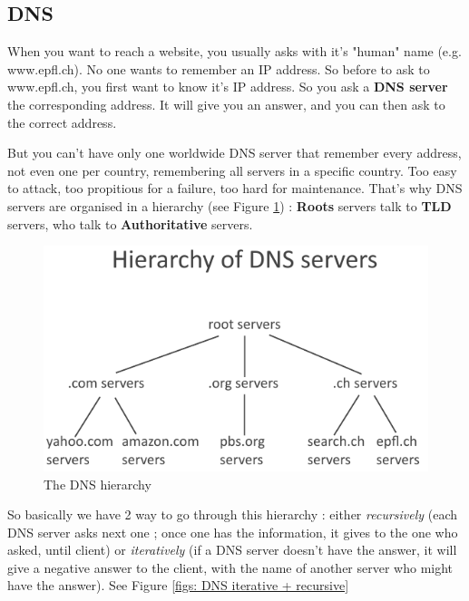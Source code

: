 \documentclass[12pt,a4paper]{article}
\begin{document}
\subsection{DNS}
When you want to reach a website, you usually asks with it's "human" name (e.g. www.epfl.ch). No one wants to remember an IP address. So before to ask to www.epfl.ch, you first want to know it's IP address. So you ask a \textbf{DNS server} the corresponding address. It will give you an answer, and you can then ask to the correct address.

But you can't have only one worldwide DNS server that remember every address, not even one per country, remembering all servers in a specific country. Too easy to attack, too propitious for a failure, too hard for maintenance. That's why DNS servers are organised in a hierarchy (see Figure \ref{fig: DNS hierarchy}) : \textbf{Roots} servers talk to \textbf{TLD} servers, who talk to \textbf{Authoritative} servers.
\begin{figure}[h]
	\centering
	\includegraphics[scale=0.5]{images/dns_Hierarchy}
	\caption{The DNS hierarchy}
	\label{fig: DNS hierarchy}
\end{figure}

So basically we have 2 way to go through this hierarchy : either \textit{recursively} (each DNS server asks next one ; once one has the information, it gives to the one who asked, until client) or \textit{iteratively} (if a DNS server doesn't have the answer, it will give a negative answer to the client, with the name of another server who might have the answer). See Figure \ref{figs: DNS iterative + recursive}
\end{document}
